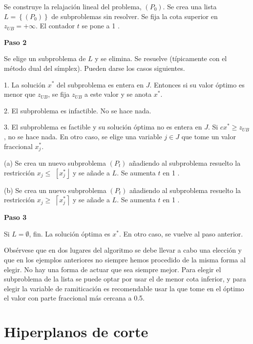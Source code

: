\documentclass[openany]{book}
\begin{document}
Se construye la relajación lineal del problema, $\left(P_{0}\right) .$ Se crea una lista $L=\left\{\left(P_{0}\right)\right\}$ de subproblemas sin resolver. Se fija la cota superior en $z_{U B}=+\infty .$ El contador $t$ se pone a 1 .

\begin{center}
\textbf{Paso 2}
\end{center}

Se elige un subproblema de $L$ y se elimina. Se resuelve (típicamente con el método dual del símplex). Pueden darse los casos siguientes.

1. La solución $x^{*}$ del subproblema es entera en $J$. Entonces si su valor óptimo es menor que $z_{U B}$, se fija $z_{U B}$ a este valor y se anota $x^{*}$.

2. El subproblema es infactible. No se hace nada.

3. El subproblema es factible y su solución óptima no es entera en $J$. Si $c x^{*} \geq z_{U B}$, no se hace nada. En otro caso, se elige una variable $j \in J$ que tome un valor fraccional $x_{j}^{*}$.

(a) Se crea un nuevo subproblema $\left(P_{t}\right)$ añadiendo al subproblema resuelto la restricción $x_{j} \leq$ $\left[x_{j}^{*}\right\rfloor$ y se añade a $L .$ Se aumenta $t$ en 1 .

(b) Se crea un nuevo subproblema $\left(P_{t}\right)$ añadiendo al subproblema resuelto la restricción $x_{j} \geq$ $\left\lceil x_{j}^{*}\right\rceil$ y se añade a $L .$ Se aumenta $t$ en 1 .

\begin{center}
\textbf{Paso 3}
\end{center}

Si $L=\emptyset$, fin. La solución óptima es $x^{*}$. En otro caso, se vuelve al paso anterior.

Obsérvese que en dos lugares del algoritmo se debe llevar a cabo una elección y que en los ejemplos anteriores no siempre hemos procedido de la misma forma al elegir. No hay una forma de actuar que sea siempre mejor. Para elegir el subproblema de la lista se puede optar por usar el de menor cota inferior, y para elegir la variable de ramiticación es recomendable usar la que tome en el óptimo el valor con parte fraccional más cercana a 0.5.

\section{Hiperplanos de corte}
\end{document}
